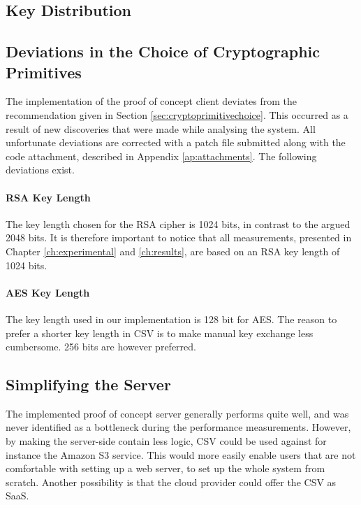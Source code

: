 \documentclass[pdftex,english,10pt,b5paper,twoside]{book}
\begin{document}
\subsection{Key Distribution}

\subsection{Deviations in the Choice of Cryptographic Primitives}

The implementation of the proof of concept client deviates from the
recommendation given in Section \ref{sec:cryptoprimitivechoice}.  This occurred
as a result of new discoveries that were made while analysing the system. All
unfortunate deviations are corrected with a patch file submitted along with the
code attachment, described in Appendix \ref{ap:attachments}. The following
deviations exist.

\paragraph{RSA Key Length} The key length chosen for the RSA cipher is 1024
bits, in contrast to the argued 2048 bits. It is therefore important to notice
that all measurements, presented in Chapter \ref{ch:experimental} and
\ref{ch:results}, are based on an RSA key length of 1024 bits.

\paragraph{AES Key Length} The key length used in our implementation is 128 bit
for \ac{AES}. The reason to prefer a shorter key length in \ac{CSV} is to make
manual key exchange less cumbersome. 256 bits are however preferred.

\subsection{Simplifying the Server}

The implemented proof of concept server generally performs quite well, and was
never identified as a bottleneck during the performance measurements. However,
by making the server-side contain less logic, \ac{CSV} could be used against
for instance the Amazon S3 service. This would more easily enable users that
are not comfortable with setting up a web server, to set up the whole system
from scratch. Another possibility is that the cloud provider could offer the
\ac{CSV} as \ac{SaaS}.
\end{document}
